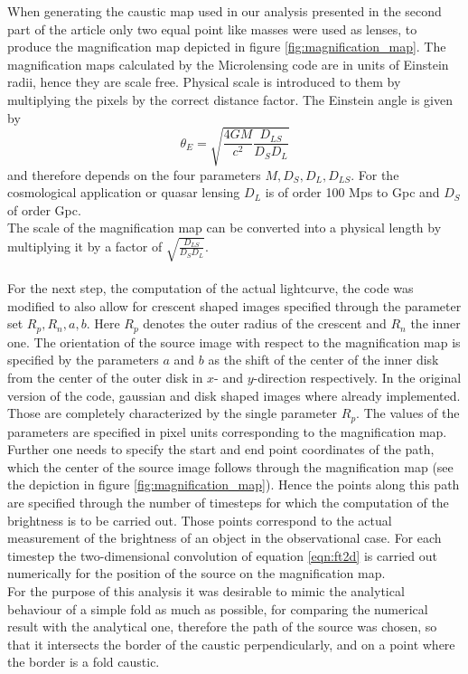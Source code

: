 When generating the caustic map used in our analysis presented in the
second part of the article only two equal point like masses were used
as lenses, to produce the magnification map depicted in figure
\ref{fig:magnification_map}. The magnification maps calculated by the
Microlensing code are in units of Einstein radii, hence they are scale
free. Physical scale is introduced to them by multiplying the pixels
by the correct distance factor. The Einstein angle is given by
\begin{equation}
\theta_{E}=\sqrt{\frac{4GM}{c^{2}} \frac{D_{LS}}{D_{S}D_{L}}} 
\end{equation}  
and therefore depends on the four parameters
$M,D_{S},D_{L},D_{LS}$. For the cosmological application or quasar
lensing $D_{L}$ is of order 100 Mps to Gpc and $D_{S}$ of order
Gpc.\\ The scale of the magnification map can be converted into a
physical length by multiplying it by a factor of
$\sqrt{\frac{D_{LS}}{D_{S}D_{L}}}$.\\\\ For the next step, the
computation of the actual lightcurve, the code was modified to also
allow for crescent shaped images specified through the parameter set
$R_p,R_n,a,b$. Here $R_p$ denotes the outer radius of the crescent and
$R_n$ the inner one. The orientation of the source image with respect
to the magnification map is specified by the parameters $a$ and $b$ as
the shift of the center of the inner disk from the center of the outer
disk in $x$- and $y$-direction respectively. In the original version
of the code, gaussian and disk shaped images where already
implemented. Those are completely characterized by the single
parameter $R_p$. The values of the parameters are specified in pixel
units corresponding to the magnification map. Further one needs to
specify the start and end point coordinates of the path, which the
center of the source image follows through the magnification map (see
the depiction in figure \ref{fig:magnification_map}). Hence the points
along this path are specified through the number of timesteps for
which the computation of the brightness is to be carried out. Those
points correspond to the actual measurement of the brightness of an
object in the observational case. For each timestep the
two-dimensional convolution of equation \ref{eqn:ft2d} is carried out
numerically for the position of the source on the magnification
map. \\ For the purpose of this analysis it was desirable to mimic the
analytical behaviour of a simple fold as much as possible, for
comparing the numerical result with the analytical one, therefore the
path of the source was chosen, so that it intersects the border of the
caustic perpendicularly, and on a point where the border is a fold
caustic.
